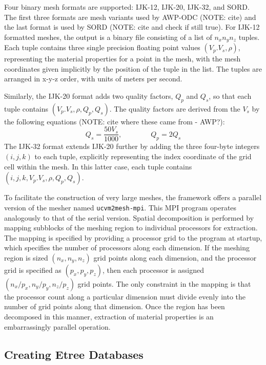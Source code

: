 Four binary mesh formats are supported: IJK-12, IJK-20, IJK-32, and SORD. The first three formats are mesh variants used by AWP-ODC (NOTE: cite) and the last format is used by SORD (NOTE: cite and check if still true). For IJK-12 formatted meshes, the output is a binary file consisting of a list of $n_xn_yn_z$ tuples. Each tuple contains three single precision floating point values $(V_p. V_s, \rho)$, representing the material properties for a point in the mesh, with the mesh coordinates given implicitly by the position of the tuple in the list. The tuples are arranged in x-y-z order, with units of meters per second. 

Similarly, the IJK-20 format adds two quality factors, $Q_p$ and $Q_s$, so that each tuple contains $(V_p. V_s, \rho, Q_p, Q_s)$. The quality factors are derived from the $V_s$ by the following equations (NOTE: cite where these came from - AWP?):
\begin{equation}
Q_s = \frac{50 V_s}{1000}, \qquad \qquad Q_p = 2 Q_s
\end{equation}
The IJK-32 format extends IJK-20 further by adding the three four-byte integers $(i,j,k)$ to each tuple, explicitly representing the index coordinate of the grid cell within the mesh. In this latter case, each tuple contains $(i, j, k, V_p. V_s, \rho, Q_p, Q_s)$.

To facilitate the construction of very large meshes, the framework offers a parallel version of the mesher named \texttt{ucvm2mesh-mpi}. This MPI program operates analogously to that of the serial version. Spatial decomposition is performed by mapping subblocks of the meshing region to individual processors for extraction. The mapping is specified by providing a processor grid to the program at startup, which specifies the number of processors along each dimension. If the meshing region is sized $(n_x, n_y, n_z)$ grid points along each dimension, and the processor grid is specified as $(p_x, p_y, p_z)$, then each processor is assigned $(n_x/p_x, n_y/p_y, n_z/p_z)$ grid points. The only constraint in the mapping is that the processor count along a particular dimension must divide evenly into the number of grid points along that dimension. Once the region has been decomposed in this manner, extraction of material properties is an embarrassingly parallel operation.  



\subsection{Creating Etree Databases}


